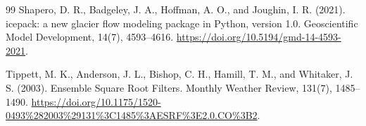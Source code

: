 \documentclass[11pt,a4paper]{article}
\begin{document}
\begin{thebibliography}{99}
 Shapero, D. R., Badgeley, J. A., Hoffman, A. O., and Joughin, I. R. (2021). icepack: a new glacier flow modeling package in Python, version 1.0. Geoscientific Model Development, 14(7), 4593--4616. \url{https://doi.org/10.5194/gmd-14-4593-2021}.

 Tippett, M. K., Anderson, J. L., Bishop, C. H., Hamill, T. M., and Whitaker, J. S. (2003). Ensemble Square Root Filters. Monthly Weather Review, 131(7), 1485--1490. \url{https://doi.org/10.1175/1520-0493%282003%29131%3C1485%3AESRF%3E2.0.CO%3B2}.
\end{thebibliography}
\end{document}
